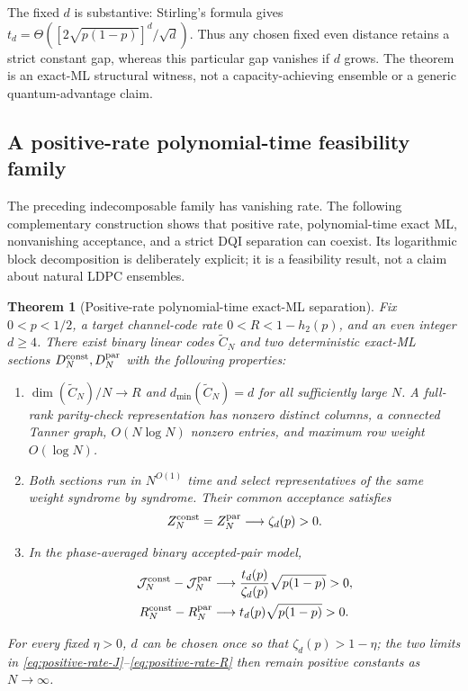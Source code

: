\documentclass[journal]{IEEEtran}
\newtheorem{theorem}{Theorem}
\theoremstyle{definition}
\theoremstyle{remark}
\begin{document}
The fixed $d$ is substantive: Stirling's formula gives
$t_d=\Theta([2\sqrt{p(1-p)}]^d/\sqrt d)$.  Thus any chosen fixed even
distance retains a strict constant gap, whereas this particular gap vanishes
if $d$ grows.  The theorem is an exact-ML structural witness, not a
capacity-achieving ensemble or a generic quantum-advantage claim.

\subsection{A positive-rate polynomial-time feasibility family}

The preceding indecomposable family has vanishing rate.  The following
complementary construction shows that positive rate, polynomial-time exact ML,
nonvanishing acceptance, and a strict DQI separation can coexist.  Its
logarithmic block decomposition is deliberately explicit; it is a feasibility
result, not a claim about natural LDPC ensembles.

\begin{theorem}[Positive-rate polynomial-time exact-ML separation]
\label{thm:positive-rate-family}
Fix $0<p<1/2$, a target channel-code rate
$0<R<1-h_2(p)$, and an even integer $d\ge4$.  There exist binary linear codes
$\widetilde C_N$ and two deterministic exact-ML sections
$D_N^{\rm const},D_N^{\rm par}$ with the following properties:
\begin{enumerate}
\item $\dim(\widetilde C_N)/N\to R$ and
$d_{\min}(\widetilde C_N)=d$ for all sufficiently large $N$.  A full-rank
parity-check representation has nonzero distinct columns, a connected Tanner
graph, $O(N\log N)$ nonzero entries, and maximum row weight $O(\log N)$.
\item Both sections run in $N^{O(1)}$ time and select representatives of the
same weight syndrome by syndrome.  Their common acceptance satisfies
\begin{equation}
 Z_N^{\rm const}=Z_N^{\rm par}\longrightarrow\zeta_d(p)>0.
 \label{eq:positive-rate-Z}
\end{equation}
\item In the phase-averaged binary accepted-pair model,
\begin{align}
 \mathcal J_N^{\rm const}-\mathcal J_N^{\rm par}
 &\longrightarrow \frac{t_d(p)}{\zeta_d(p)}\sqrt{p(1-p)}>0,
 \label{eq:positive-rate-J}\\
 R_N^{\rm const}-R_N^{\rm par}
 &\longrightarrow t_d(p)\sqrt{p(1-p)}>0.
 \label{eq:positive-rate-R}
\end{align}
\end{enumerate}
For every fixed $\eta>0$, $d$ can be chosen once so that
$\zeta_d(p)>1-\eta$; the two limits in
\eqref{eq:positive-rate-J}--\eqref{eq:positive-rate-R} then remain positive
constants as $N\to\infty$.
\end{theorem}
\end{document}
